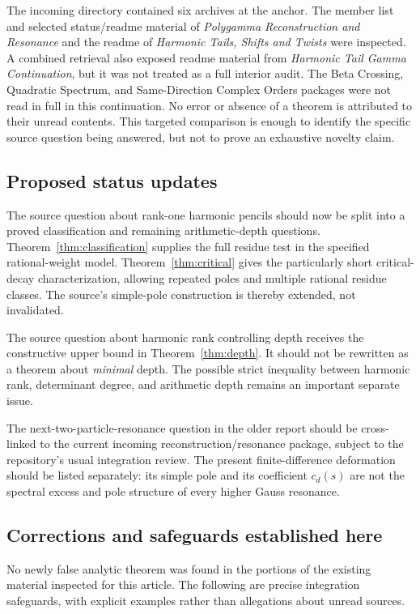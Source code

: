 \documentclass[11pt,letterpaper]{article}
\numberwithin{equation}{section}
\theoremstyle{definition}\newtheorem{definition}[theorem]{Definition}
\theoremstyle{remark}\newtheorem{remark}[theorem]{Remark}
\begin{document}
The incoming directory contained six archives at the anchor. The member
list and selected status/readme material of
\emph{Polygamma Reconstruction and Resonance} and the readme of
\emph{Harmonic Tails, Shifts and Twists} were inspected. A combined retrieval
also exposed readme material from \emph{Harmonic Tail Gamma Continuation},
but it was not treated as a full interior audit. The Beta Crossing,
Quadratic Spectrum, and Same-Direction Complex Orders packages were not
read in full in this continuation. No error or absence of a theorem is
attributed to their unread contents. This targeted comparison is enough
to identify the specific source question being answered, but not to prove
an exhaustive novelty claim.

\subsection{Proposed status updates}
The source question about rank-one harmonic pencils should now be split
into a proved classification and remaining arithmetic-depth questions.
Theorem~\ref{thm:classification} supplies the full residue test in the
specified rational-weight model. Theorem~\ref{thm:critical} gives the
particularly short critical-decay characterization, allowing repeated
poles and multiple rational residue classes. The source's simple-pole
construction is thereby extended, not invalidated.

The source question about harmonic rank controlling depth receives the
constructive upper bound in Theorem~\ref{thm:depth}. It should not be
rewritten as a theorem about \emph{minimal} depth. The possible strict
inequality between harmonic rank, determinant degree, and arithmetic depth
remains an important separate issue.

The next-two-particle-resonance question in the older report should be
cross-linked to the current incoming reconstruction/resonance package,
subject to the repository's usual integration review. The present
finite-difference deformation should be listed separately: its simple
pole and its coefficient $c_d(s)$ are not the spectral excess and pole
structure of every higher Gauss resonance.

\subsection{Corrections and safeguards established here}
No newly false analytic theorem was found in the portions of the existing
material inspected for this article. The following are precise
integration safeguards, with explicit examples rather than allegations
about unread sources.
\end{document}
